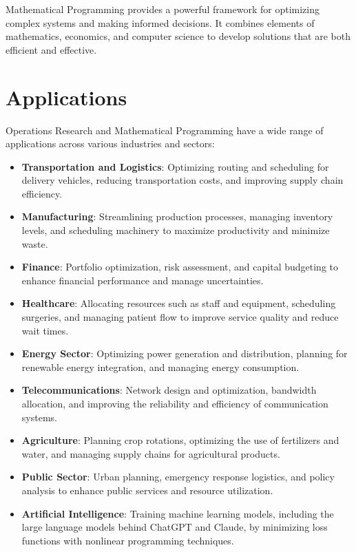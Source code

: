 Mathematical Programming provides a powerful framework for optimizing complex systems and making informed decisions. It combines elements of mathematics, economics, and computer science to develop solutions that are both efficient and effective.

\section{Applications}

Operations Research and Mathematical Programming have a wide range of applications across various industries and sectors:

\begin{itemize}
    \item \textbf{Transportation and Logistics}: Optimizing routing and scheduling for delivery vehicles, reducing transportation costs, and improving supply chain efficiency.
    \item \textbf{Manufacturing}: Streamlining production processes, managing inventory levels, and scheduling machinery to maximize productivity and minimize waste.
    \item \textbf{Finance}: Portfolio optimization, risk assessment, and capital budgeting to enhance financial performance and manage uncertainties.
    \item \textbf{Healthcare}: Allocating resources such as staff and equipment, scheduling surgeries, and managing patient flow to improve service quality and reduce wait times.
    \item \textbf{Energy Sector}: Optimizing power generation and distribution, planning for renewable energy integration, and managing energy consumption.
    \item \textbf{Telecommunications}: Network design and optimization, bandwidth allocation, and improving the reliability and efficiency of communication systems.
    \item \textbf{Agriculture}: Planning crop rotations, optimizing the use of fertilizers and water, and managing supply chains for agricultural products.
    \item \textbf{Public Sector}: Urban planning, emergency response logistics, and policy analysis to enhance public services and resource utilization.
    \item \textbf{Artificial Intelligence}: Training machine learning models, including the large language models behind ChatGPT and Claude, by minimizing loss functions with nonlinear programming techniques.
\end{itemize}

